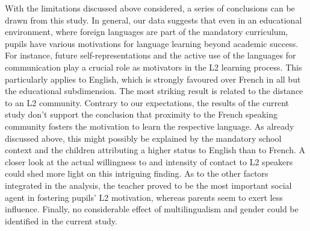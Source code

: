 \documentclass[output=paper]{langsci/langscibook}
\begin{document}
With the limitations discussed above considered, a series of conclusions can be drawn from this study. In general, our data suggests that even in an educational environment, where foreign languages are part of the mandatory curriculum, pupils have various motivations for language learning beyond academic success. For instance, future self-representations and the active use of the languages for communication play a crucial role as motivators in the L2 learning process. This particularly applies to English, which is strongly favoured over French in all but the educational subdimension. The most striking result is related to the distance to an L2 community. Contrary to our expectations, the results of the current study don’t support the conclusion that proximity to the French speaking community fosters the motivation to learn the respective language. As already discussed above, this might possibly be explained by the mandatory school context and the children attributing a higher status to English than to French. A closer look at the actual willingness to and intensity of contact to L2 speakers could shed more light on this intriguing finding. As to the other factors integrated in the analysis, the teacher proved to be the most important social agent in fostering pupils’ L2 motivation, whereas parents seem to exert less influence. Finally, no considerable effect of multilingualism and gender could be identified in the current study.


{\sloppy\printbibliography[heading=subbibliography,notkeyword=this]}
\end{document}
